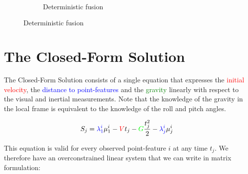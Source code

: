 \documentclass[final]{beamer}
\begin{document}
\begin{frame}[t]
\begin{multicols}{3}
\begin{figure}
\begin{subfigure}[t]{0.3\columnwidth}
  \end{subfigure}~
  \hspace*{5.5em}
  \begin{subfigure}[t]{0.3\columnwidth}
    \caption{Deterministic fusion}
    \hspace*{1.2em}

  \end{subfigure}
\end{figure}

\vspace{4cm}

\section{The Closed-Form Solution}

The Closed-Form Solution consists of a single equation that expresses the \textcolor{red}{initial velocity}, the \textcolor{blue}{distance to point-features} and the \textcolor{green}{gravity} linearly with respect to the visual and inertial measurements.
Note that the knowledge of the gravity in the local frame is equivalent to the knowledge of the roll and pitch angles.

\[
S_j = \textcolor{blue}{\lambda_1^i}\mu_1^i - \textcolor{red}{V} t_j - \textcolor{green}{G} \frac{t_j^2}{2} - \textcolor{blue}{\lambda^i_j} \mu^i_j
\]

This equation is valid for every observed point-feature $i$ at any time $t_j$.
We therefore have an overconstrained linear system that we can write in matrix formulation:


\end{multicols}
\end{frame}
\end{document}
